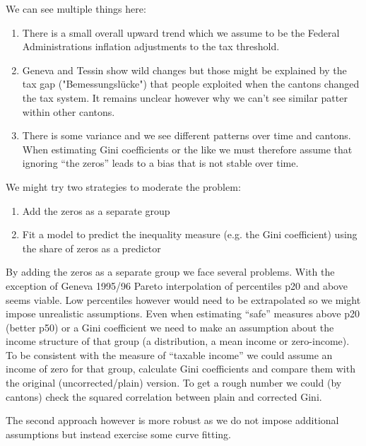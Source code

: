 \documentclass[twoside]{article}\usepackage[]{graphicx}\usepackage[]{color}
\newenvironment{knitrout}{}{} %
\begin{document}
\begin{multicols}{2}
\begin{knitrout}
\end{knitrout}

We can see multiple things here:

\begin{enumerate}
\item There is a small overall upward trend which we assume to be the Federal Administrations inflation adjustments to the tax threshold.
\item Geneva and Tessin show wild changes but those might be explained by the tax gap ("Bemessungslücke") that people exploited when the cantons changed the tax system. It remains unclear however why we can't see similar patter within other cantons.
\item There is some variance and we see different patterns over time and cantons. When estimating Gini coefficients or the like we must therefore assume that ignoring ``the zeros'' leads to a bias that is not stable over time.
\end{enumerate}

We might try two strategies to moderate the problem:

\begin{enumerate}
\item Add the zeros as a separate group
\item Fit a model to predict the inequality measure (e.g. the Gini coefficient) using the share of zeros as a predictor
\end{enumerate}

By adding the zeros as a separate group we face several problems. With the exception of Geneva 1995/96 Pareto interpolation of percentiles p20 and above seems viable. Low percentiles however would need to be extrapolated so we might impose unrealistic assumptions. Even when estimating ``safe'' measures above p20 (better p50) or a Gini coefficient we need to make an assumption about the income structure of that group (a distribution, a mean income or zero-income). To be consistent with the measure of ``taxable income'' we could assume an income of zero for that group, calculate Gini coefficients and compare them with the original (uncorrected/plain) version. To get a rough number we could (by cantons) check the squared correlation between plain and corrected Gini.

The second approach however is more robust as we do not impose additional assumptions but instead exercise some curve fitting.


\end{multicols}
\end{document}

